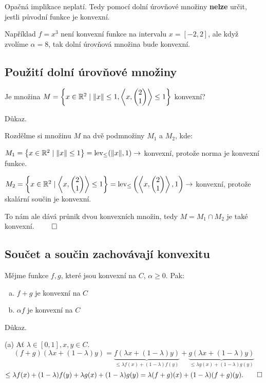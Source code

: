 Opačná implikace neplatí. Tedy pomocí dolní úrovňové množiny \textbf{nelze} určit, jestli původní funkce je konvexní.

Například $f = x^3$ není konvexní funkce na intervalu $x = [-2, 2]$, ale když zvolíme $\alpha = 8$, tak dolní úrovňová
množina bude konvexní.

\subsection{Použití dolní úrovňové množiny}
Je množina $M = \left\lbrace x \in \mathbb{R}^2 \mid \| x\| \leq 1, \left\langle x,
\begin{pmatrix}
    2 \\
    1
\end{pmatrix}
\right\rangle \leq 1 \right\rbrace$ konvexní?

Důkaz.

Rozdělme si množinu $M$ na dvě podmnožiny $M_1$ a $M_2$, kde:

$M_1 = \left\lbrace x \in \mathbb{R}^2 \mid \| x\| \leq 1 \right\rbrace = \operatorname*{lev}_{\leq} (\| x\|, 1) \rightarrow$ konvexní, protože norma je konvexní
funkce.

$M_2 = \left\lbrace x \in \mathbb{R}^2 \mid \left\langle x,
\begin{pmatrix}
    2 \\
    1
\end{pmatrix}
\right\rangle \leq 1 \right\rbrace = \operatorname*{lev}_{\leq} \left(\left\langle x,
\begin{pmatrix}
    2 \\
    1
\end{pmatrix}
\right\rangle, 1\right) \rightarrow$ konvexní, protože skalární součin je konvexní.

To nám ale dává průnik dvou konvexních množin, tedy $M = M_1 \cap M_2$ je také konvexní. $\qed$

\newpage
\subsection{Součet a součin zachovávají konvexitu}\label{ssKonv}
Mějme funkce $f, g$, které jsou konvexní na $C$, $\alpha \geq 0$. Pak:
\begin{enumerate}[(a)]
    \item $f+g$ je konvexní na $C$
    \item $\alpha f$ je konvexní na $C$
\end{enumerate}
Důkaz.

(a) Ať $\lambda \in [0,1], x, y \in C$.
\[
    (f+g)(\lambda x + (1-\lambda)y) = \underbrace{f(\lambda x + (1-\lambda)y)}_{\leq \lambda f(x) + (1-\lambda)f(y)} +
    \underbrace{g(\lambda x + (1-\lambda)y)}_{\leq \lambda g(x) + (1-\lambda)g(y)}
\]
\[
    \leq \lambda f(x) + (1-\lambda)f(y) + \lambda g(x) + (1-\lambda)g(y) = \lambda (f+g)(x) + (1-\lambda)(f+g)(y). \qed
\]

